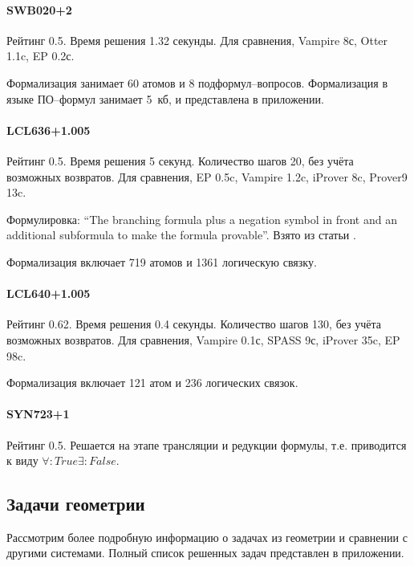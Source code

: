 \paragraph{SWB020+2}
Рейтинг 0.5. Время решения 1.32 секунды. Для сравнения, Vampire 8с, Otter 1.1c, EP 0.2с.

Формализация занимает 60 атомов и 8 подформул--вопросов. Формализация в языке ПО--формул занимает 5~кб, и представлена в приложении.

\paragraph{LCL636+1.005}
Рейтинг 0.5. Время решения 5 секунд. Количество шагов 20, без учёта возможных возвратов. Для сравнения, EP 0.5c, Vampire 1.2c, iProver 8c, Prover9 13c.

Формулировка: ``The branching formula plus a negation symbol in front and an additional subformula to make the formula provable''.
Взято из статьи \cite{SourceLCL}.

Формализация включает 719 атомов и 1361 логическую связку.


\paragraph{LCL640+1.005}
Рейтинг 0.62. Время решения 0.4 секунды. Количество шагов 130, без учёта возможных возвратов. Для сравнения, Vampire 0.1с, SPASS 9с, iProver 35c, EP 98c.

Формализация включает 121 атом и 236 логических связок.

\paragraph{SYN723+1}
Рейтинг 0.5. Решается на этапе трансляции и редукции формулы, т.е. приводится к виду $\forall: True \exists: False$.



\subsection{Задачи геометрии}
Рассмотрим более подробную информацию о задачах из геометрии и сравнении с другими системами. Полный список решенных задач представлен в приложении.

